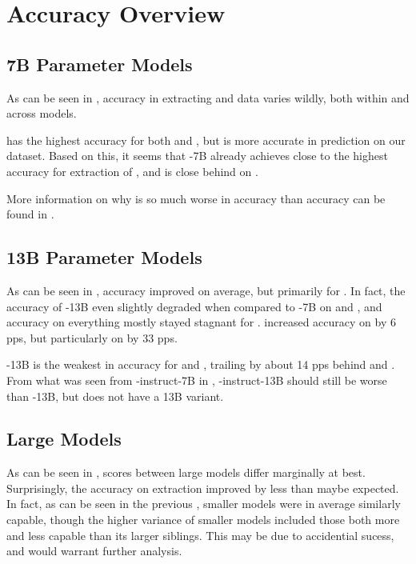 \section{Accuracy Overview}\label{sec:result:first}

\subsection{7B Parameter Models}\label{sub:result:7b}
As can be seen in , accuracy in extracting \ttemp and \ttime data varies wildly, both within and across models.

 has the highest accuracy for both \ttemp and \ttime, but  is more accurate in \tsolv prediction on our dataset.
Based on this, it seems that -7B already achieves close to the highest accuracy for extraction of \ttemp, and is close behind on \ttime.

More information on why  is so much worse in \ttime accuracy than \ttemp accuracy can be found in .


\subsection{13B Parameter Models}\label{sub:result:13b}

As can be seen in , accuracy improved on average, but primarily for .
In fact, the accuracy of -13B even slightly degraded when compared to -7B on \ttemp and \ttime, and accuracy on everything mostly stayed stagnant for .
 increased accuracy on \ttemp by 6 \glspl{pp}, but particularly on \ttime by 33 \glspl{pp}.

-13B is the weakest in accuracy for \ttemp and \ttime, trailing by about 14 \glspl{pp} behind  and .
From what was seen from -instruct-7B in , -instruct-13B should still be worse than -13B, but  does not have a 13B variant.

\subsection{Large Models}\label{sub:result:large}
As can be seen in , scores between large models differ marginally at best.
Surprisingly, the accuracy on \tsolv extraction improved by less than maybe expected.
In fact, as can be seen in the previous , smaller models were in average similarly capable, though the higher variance of smaller models included those both more and less capable than its larger siblings.
This may be due to accidential sucess, and would warrant further analysis.




